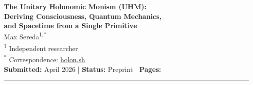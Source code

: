 \documentclass[10pt,letterpaper]{article}
\theoremstyle{uhm}
\begin{document}
\begin{center}
  {\LARGE\bfseries
  The Unitary Holonomic Monism (UHM):\\[4pt]
  Deriving Consciousness, Quantum Mechanics,\\[4pt]
  and Spacetime from a Single Primitive}\\[16pt]

  {\large Max Sereda\textsuperscript{1,*}}\\[8pt]

  {\small
  \textsuperscript{1} Independent researcher\\[4pt]
  \textsuperscript{*} Correspondence: \href{https://holon.sh}{holon.sh}
  }\\[16pt]

  {\small\color{plosgray}
  \textbf{Submitted:} April 2026 \quad|\quad
  \textbf{Status:} Preprint \quad|\quad
  \textbf{Pages:} \pageref{LastPage}
  }
\end{center}

\vspace{12pt}
\hrule
\vspace{12pt}
\end{document}
